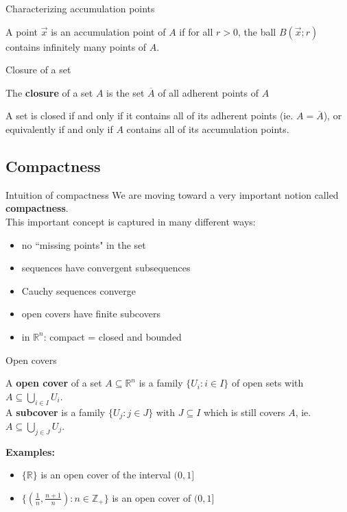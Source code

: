 \documentclass{beamer}
\begin{document}
\begin{frame}{Characterizing accumulation points}
\begin{thm}
A point $\vec x$ is an accumulation point of $A$ if for all $r > 0$, the ball $B(\vec x; r)$ contains infinitely many points of $A$.
\end{thm}
\end{frame}

\begin{frame}{Closure of a set}
\begin{defn}
The \textbf{closure} of a set $A$ is the set $\overline{A}$ of all adherent points of $A$
\end{defn}
\pause
\begin{thm}
A set is closed if and only if it contains all of its adherent points (ie. $A= \overline{A}$), or equivalently if and only if $A$ contains all of its accumulation points. 
\end{thm}
\end{frame}

\subsection{Compactness}

\begin{frame}{Intuition of compactness}
We are moving toward a very important notion called \textbf{compactness}.\\
\pause
This important concept is captured in many different ways:
\begin{itemize}
\pause
\item no ``missing points" in the set
\pause
\item sequences have convergent subsequences
\pause
\item Cauchy sequences converge
\pause
\item open covers have finite subcovers
\pause
\item in $\mathbb{R}^n$: compact = closed and bounded
\end{itemize}
\end{frame}


\begin{frame}{Open covers}
\begin{defn}
A \textbf{open cover} of a set $A\subseteq\mathbb{R}^n$ is a family $\{U_i: i\in I\}$ of open sets with $A\subseteq \bigcup_{i\in I} U_i$.\\\pause
A \textbf{subcover} is a family $\{U_j: j\in J\}$ with $J\subseteq I$ which is still covers $A$, ie. $A\subseteq \bigcup_{j\in J} U_j$.
\end{defn}
\pause
\textbf{Examples:}
\begin{itemize}
\pause
\item $\{\mathbb{R}\}$ is an open cover of the interval $(0,1]$
\pause
\item $\{(\frac{1}{n},\frac{n+1}{n}): n\in\mathbb{Z}_+\}$ is an open cover of $(0,1]$
\end{itemize}
\end{frame}
\end{document}
